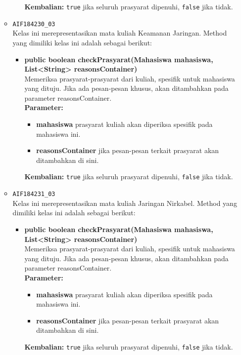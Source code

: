 \begin{enumerate}
\begin{itemize}
\begin{itemize}
\begin{itemize}
			\end{itemize}
			\textbf{Kembalian:} \texttt{true} jika seluruh prasyarat dipenuhi, \texttt{false} jika tidak.
		\end{itemize}
		\item \texttt{AIF184230\_03} \\
		Kelas ini merepresentasikan mata kuliah Keamanan Jaringan. Method yang dimiliki kelas ini adalah sebagai berikut: 
		\begin{itemize}
			\item \textbf{public boolean checkPrasyarat(Mahasiswa mahasiswa, List<String> reasonsContainer)}\\
			Memeriksa prasyarat-prasyarat dari kuliah, spesifik untuk mahasiswa yang dituju. Jika ada pesan-pesan khusus, akan ditambahkan pada parameter reasonsContainer.\\
			\textbf{Parameter:}
			\begin{itemize}
				\item \textbf{mahasiswa} prasyarat kuliah akan diperiksa spesifik pada mahasiswa ini.
				\item \textbf{reasonsContainer} jika pesan-pesan terkait prasyarat akan ditambahkan di sini.
			\end{itemize}
			\textbf{Kembalian:} \texttt{true} jika seluruh prasyarat dipenuhi, \texttt{false} jika tidak.
		\end{itemize}
		\item \texttt{AIF184231\_03} \\
		Kelas ini merepresentasikan mata kuliah Jaringan Nirkabel. Method yang dimiliki kelas ini adalah sebagai berikut: 
		\begin{itemize}
			\item \textbf{public boolean checkPrasyarat(Mahasiswa mahasiswa, List<String> reasonsContainer)}\\
			Memeriksa prasyarat-prasyarat dari kuliah, spesifik untuk mahasiswa yang dituju. Jika ada pesan-pesan khusus, akan ditambahkan pada parameter reasonsContainer.\\
			\textbf{Parameter:}
			\begin{itemize}
				\item \textbf{mahasiswa} prasyarat kuliah akan diperiksa spesifik pada mahasiswa ini.
				\item \textbf{reasonsContainer} jika pesan-pesan terkait prasyarat akan ditambahkan di sini.
			\end{itemize}
			\textbf{Kembalian:} \texttt{true} jika seluruh prasyarat dipenuhi, \texttt{false} jika tidak.

\end{itemize}
\end{itemize}
\end{enumerate}

